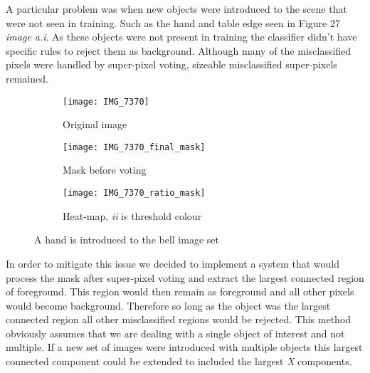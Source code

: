 \documentclass[12pt]{IIBproject}
\begin{document}
A particular problem was when new objects were introduced to the scene that were not seen in training. Such as the hand and table edge seen in Figure 27 \emph{image a.i}. As these objects were not present in training the classifier didn't have specific rules to reject them as background. Although many of the misclassified pixels were handled by super-pixel voting, sizeable misclassified super-pixels remained.
\begin{figure}[H]
\centering
\begin{subfigure}{.33\textwidth}
  \centering
  \texttt{[image: IMG\_7370]}
  \caption{Original image}
  \label{fig:sub2}
\end{subfigure}
\begin{subfigure}{.33\textwidth}
  \centering
  \texttt{[image: IMG\_7370\_final\_mask]}
  \caption{Mask before voting}
  \label{fig:sub1}
\end{subfigure}%
\begin{subfigure}{.33\textwidth}
  \centering
  \texttt{[image: IMG\_7370\_ratio\_mask]}
  \caption{Heat-map, \emph{ii} is threshold colour}
  \label{fig:sub2}
\end{subfigure}

\caption{A hand is introduced to the bell image set}
\label{fig:test}
\end{figure}
In order to mitigate this issue we decided to implement a system that would process the mask after super-pixel voting and extract the largest connected region of foreground. This region would then remain as foreground and all other pixels would become background. Therefore so long as the object was the largest connected region all other misclassified regions would be rejected. This method obviously assumes that we are dealing with a single object of interest and not multiple. If a new set of images were introduced with multiple objects this largest connected component could be extended to included the largest \emph{X} components. 
\end{document}
